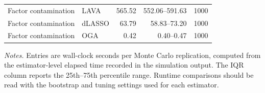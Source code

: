 \begin{table}[htb!]
\begin{center}
\begin{tabular}{llrrr}
Factor contamination & LAVA & 565.52 & 552.06--591.63 & 1000 \\
Factor contamination & dLASSO & 63.79 & 58.83--73.20 & 1000 \\
Factor contamination & OGA & 0.42 & 0.40--0.47 & 1000 \\
\bottomrule
\end{tabular}
\end{center}
{\footnotesize \textit{Notes.} Entries are wall-clock seconds per Monte Carlo replication, computed from the estimator-level elapsed time recorded in the simulation output. The IQR column reports the 25th--75th percentile range. Runtime comparisons should be read with the bootstrap and tuning settings used for each estimator.}
\end{table}

